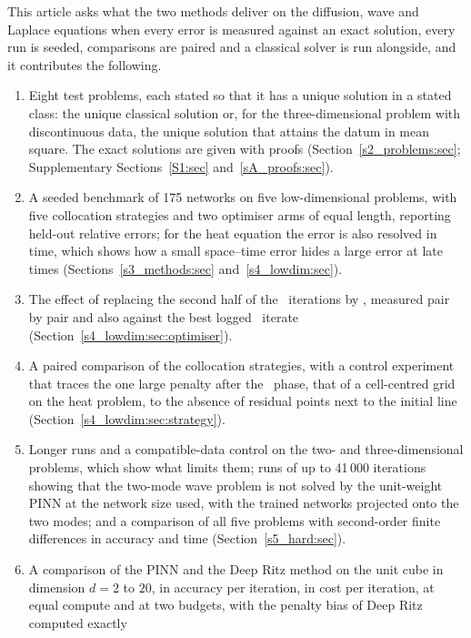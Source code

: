 This article asks what the two methods deliver on the diffusion, wave and Laplace equations
when every error is measured against an exact solution, every run is seeded, comparisons are
paired and a classical solver is run alongside, and it contributes the following.
\begin{enumerate}[label=(C\arabic*),leftmargin=*]
\item Eight test problems, each stated so that it has a unique solution in a stated class:
the unique classical solution or, for the three-dimensional problem with discontinuous
data, the unique solution that attains the datum in mean square. The exact solutions are
given with proofs (Section~\ref{s2_problems:sec}; Supplementary
Sections~\ref{S1:sec} and~\ref{sA_proofs:sec}).
\item A seeded benchmark of 175 networks on five low-dimensional problems, with five
collocation strategies and two optimiser arms of equal length, reporting held-out relative
errors; for the heat equation the error is also resolved in time, which shows how a small
space--time error hides a large error at late times (Sections~\ref{s3_methods:sec}
and~\ref{s4_lowdim:sec}).
\item The effect of replacing the second half of the \Adam\ iterations by \LBFGS, measured
pair by pair and also against the best logged \Adam\ iterate
(Section~\ref{s4_lowdim:sec:optimiser}).
\item A paired comparison of the collocation strategies, with a control experiment that
traces the one large penalty after the \LBFGS\ phase, that of a cell-centred grid on the
heat problem, to the absence of residual points next to the initial line
(Section~\ref{s4_lowdim:sec:strategy}).
\item Longer runs and a compatible-data control on the two- and three-dimensional problems,
which show what limits them; runs of up to 41\,000 iterations showing that the two-mode wave
problem is not solved by the unit-weight PINN at the network size used, with the trained
networks projected onto the two modes; and a comparison of all five problems with
second-order finite differences in accuracy and time (Section~\ref{s5_hard:sec}).
\item A comparison of the PINN and the Deep Ritz method on the unit cube in dimension $d=2$
to $20$, in accuracy per iteration, in cost per iteration, at equal compute and at two
budgets, with the penalty bias of Deep Ritz computed exactly

\end{enumerate}
